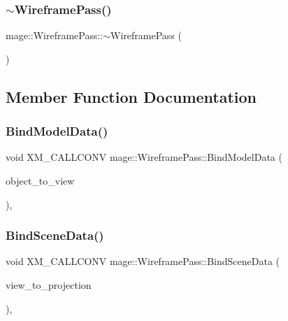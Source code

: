 \hypertarget{classmage_1_1_wireframe_pass_a186e4dd37ac17382872180385ec4dca1}{}\label{classmage_1_1_wireframe_pass_a186e4dd37ac17382872180385ec4dca1} 
\subsubsection{\texorpdfstring{$\sim$\+Wireframe\+Pass()}{~WireframePass()}}
{\footnotesize\ttfamily mage\+::\+Wireframe\+Pass\+::$\sim$\+Wireframe\+Pass (\begin{DoxyParamCaption}{ }\end{DoxyParamCaption})\hspace{0.3cm}{\ttfamily [default]}}



\subsection{Member Function Documentation}
\hypertarget{classmage_1_1_wireframe_pass_a7add5e805d8d8afe450e48a553c76176}{}\label{classmage_1_1_wireframe_pass_a7add5e805d8d8afe450e48a553c76176} 
\subsubsection{\texorpdfstring{Bind\+Model\+Data()}{BindModelData()}}
{\footnotesize\ttfamily void X\+M\+\_\+\+C\+A\+L\+L\+C\+O\+NV mage\+::\+Wireframe\+Pass\+::\+Bind\+Model\+Data (\begin{DoxyParamCaption}\item[{F\+X\+M\+M\+A\+T\+R\+IX}]{object\+\_\+to\+\_\+view }\end{DoxyParamCaption})\hspace{0.3cm}{\ttfamily [private]}, {\ttfamily [noexcept]}}

\hypertarget{classmage_1_1_wireframe_pass_ac77daacc9476b78474eeafc5822976f1}{}\label{classmage_1_1_wireframe_pass_ac77daacc9476b78474eeafc5822976f1} 
\subsubsection{\texorpdfstring{Bind\+Scene\+Data()}{BindSceneData()}}
{\footnotesize\ttfamily void X\+M\+\_\+\+C\+A\+L\+L\+C\+O\+NV mage\+::\+Wireframe\+Pass\+::\+Bind\+Scene\+Data (\begin{DoxyParamCaption}\item[{F\+X\+M\+M\+A\+T\+R\+IX}]{view\+\_\+to\+\_\+projection }\end{DoxyParamCaption})\hspace{0.3cm}{\ttfamily [private]}, {\ttfamily [noexcept]}}

